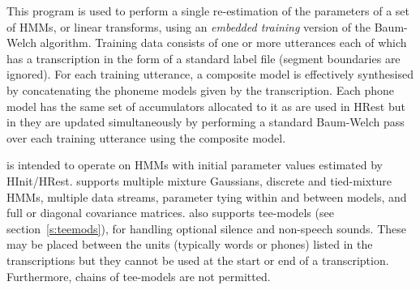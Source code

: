 %
%

\newpage
{}


 This program is used to perform a
single re-estimation of the parameters of a set of HMMs, or linear
transforms, using an {\em embedded training} version of the Baum-Welch
algorithm.  Training data consists of one or more utterances each of
which has a transcription in the form of a standard label file
(segment boundaries are ignored).  For each training utterance, a
composite model is effectively synthesised by concatenating the
phoneme models given by the transcription.  Each phone model has the
same set of accumulators allocated to it as are used in HRest but in
 they are updated simultaneously by performing a
standard Baum-Welch pass over each training utterance using the
composite model.
  
 is intended to operate on HMMs with initial parameter values 
estimated by HInit/HRest.
 supports multiple mixture Gaussians, discrete and tied-mixture
HMMs, multiple data streams, parameter tying within and between models, and
full or diagonal covariance matrices.  also supports tee-models
(see section~\ref{s:teemods}), for handling optional silence and non-speech
sounds. These may be placed between the units (typically words or phones)
listed in the transcriptions but they cannot be used at the start or end of a
transcription. Furthermore, chains of tee-models are not permitted.

